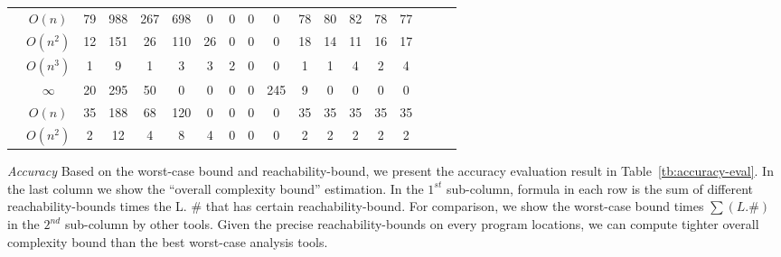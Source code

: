 \begin{table}[ht]
{\begin{tabular}{ | >{\scriptsize}c | >{\scriptsize}c | >{\scriptsize}c | >{\scriptsize}c | >{\scriptsize}c | c | c | c | c | c | c | c | c | c | c | c | c | c |}
    \cline{2-2}
    & $O(n)$ & 79 & 988 & 267 & 698 & 0 & 0 & 0 & 0 & 78 & 80 & 82 & 78 & 77  \\
    \cline{2-2}
    & $O(n^2)$ & 12 & 151 & 26 & 110 & 26 & 0 & 0 & 0 & 18 & 14 & 11 & 16 & 17  \\
    \cline{2-2}
    & $O(n^3)$ & 1 &  9 & 1 & 3 & 3 & 2 & 0 & 0 & 1 & 1 & 4 & 2 & 4  \\
    \cline{2-2}
    & $\infty$ & 20 & 295 &  50 & 0 & 0 & 0 & 0 & 245 & 9 & 0 & 0 & 0 & 0  \\
    \hline \hline
    \multirow{2}{*}{Tianhan} 
    & $O(n)$ & 35 & 188 & 68 & 120 & 0 & 0 & 0 & 0 & 35 & 35 & 35 & 35 & 35  \\
    \cline{2-2}
    & $O(n^2)$ & 2 & 12 & 4 & 8 & 4 & 0 & 0 & 0 & 2 & 2 & 2 & 2 & 2   \\
    \hline
    \hline
    \end{tabular}
    }
    \end{table}

\emph{Accuracy}
Based on the worst-case bound and reachability-bound, we present the accuracy evaluation result in
Table~\ref{tb:accuracy-eval}.
In the last column we show the ``overall complexity bound'' estimation.
In the $1^{st}$ sub-column, formula in each row is the sum of different reachability-bounds times the L. \# that has certain reachability-bound.
For comparison, we show the worst-case bound times $\sum(L. \#)$ in the $2^{nd}$ sub-column by other tools. Given the precise reachability-bounds on every program locations, we can compute tighter overall complexity bound than the best worst-case analysis tools.

